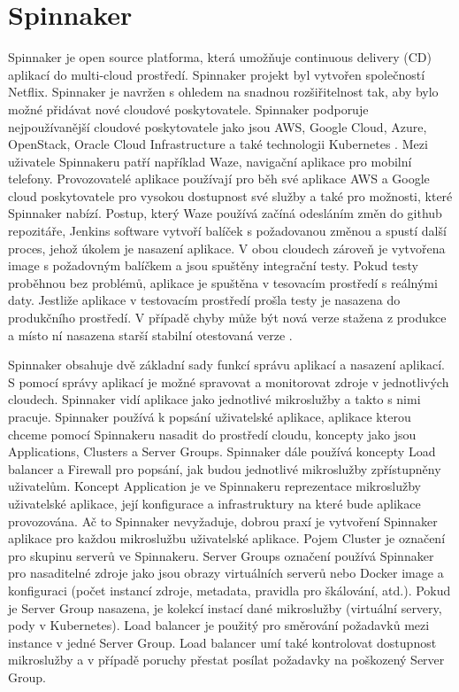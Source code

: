 \section{Spinnaker}
Spinnaker je open source platforma, která umožňuje continuous delivery (CD) aplikací do multi-cloud prostředí. Spinnaker projekt byl vytvořen společností Netflix. Spinnaker je navržen s ohledem na snadnou rozšiřitelnost tak, aby bylo možné přidávat nové cloudové poskytovatele. Spinnaker podporuje nejpoužívanější cloudové poskytovatele jako jsou AWS, Google Cloud, Azure, OpenStack, Oracle Cloud Infrastructure a také technologii Kubernetes \cite{netflix-spinnaker}. Mezi uživatele Spinnakeru patří například Waze, navigační aplikace pro mobilní telefony. Provozovatelé aplikace používají pro běh své aplikace AWS a Google cloud poskytovatele pro vysokou dostupnost své služby a také pro možnosti, které Spinnaker nabízí. Postup, který Waze používá začíná odesláním změn do github repozitáře, Jenkins software vytvoří balíček s požadovanou změnou a spustí další proces, jehož úkolem je nasazení aplikace. V obou cloudech zároveň je vytvořena image s požadovným balíčkem a jsou spuštěny integrační testy. Pokud testy proběhnou bez problémů, aplikace je spuštěna v tesovacím prostředí s reálnými daty. Jestliže aplikace v testovacím prostředí prošla testy je nasazena do produkčního prostředí. V případě chyby může být nová verze stažena z produkce a místo ní nasazena starší stabilní otestovaná verze \cite{waze}.\par
Spinnaker obsahuje dvě základní sady funkcí správu aplikací a nasazení aplikací. S pomocí správy aplikací je možné spravovat a monitorovat zdroje v jednotlivých \linebreak cloudech. Spinnaker vidí aplikace jako jednotlivé mikroslužby a takto s nimi pracuje. Spinnaker používá k popsání uživatelské aplikace, aplikace kterou chceme pomocí Spinnakeru nasadit do prostředí cloudu, koncepty jako jsou Applications, Clusters a Server Groups. Spinnaker dále používá koncepty Load balancer a Firewall pro popsání, jak budou jednotlivé mikroslužby zpřístupněny uživatelům. Koncept Application je ve Spinnakeru reprezentace mikroslužby uživatelské aplikace, její konfigurace a infrastruktury na které bude aplikace provozována. Ač to Spinnaker nevyžaduje, dobrou praxí je vytvoření Spinnaker aplikace pro každou mikroslužbu uživatelské aplikace. Pojem Cluster je označení pro skupinu serverů ve Spinnakeru. Server Groups označení používá Spinnaker pro nasaditelné zdroje jako jsou obrazy virtuálních serverů nebo Docker image a konfiguraci (počet instancí zdroje, metadata, pravidla pro škálování, atd.). Pokud je Server Group nasazena, je kolekcí instací dané mikroslužby (virtuální servery, pody v Kubernetes). Load balancer je použitý pro směrování požadavků mezi instance v jedné Server Group. Load balancer umí také kontrolovat dostupnost \linebreak mikroslužby a v případě poruchy přestat posílat požadavky na poškozený Server Group.\par
